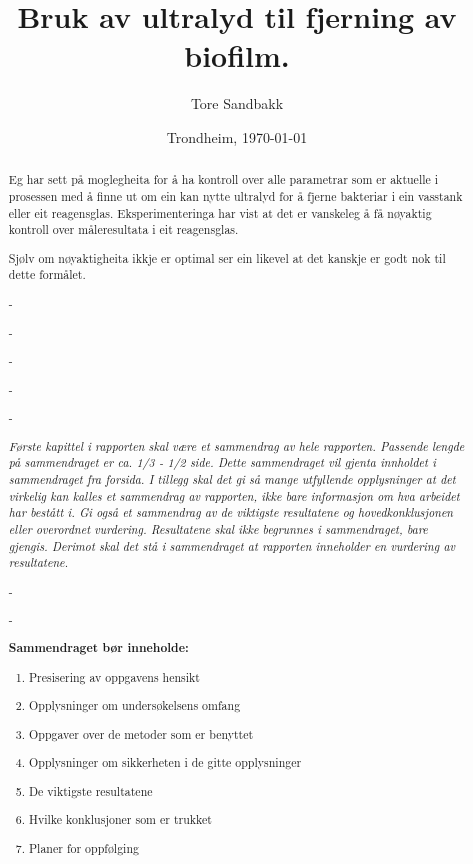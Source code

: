\documentclass[12pt,norsk]{article}
\title{Bruk av ultralyd til fjerning av biofilm.}
\author{Tore Sandbakk}
\date{Trondheim, \today}                                           %
\begin{document}
\maketitle
\thispagestyle{empty}

\newpage
\thispagestyle{empty}

\begin{abstract}
Eg har sett på moglegheita for å ha kontroll over alle parametrar som er aktuelle i prosessen med å finne ut om ein kan nytte ultralyd for å fjerne bakteriar i ein vasstank eller eit reagensglas. Eksperimenteringa har vist at det er vanskeleg å få nøyaktig kontroll over måleresultata i eit reagensglas.

Sjølv om nøyaktigheita ikkje er optimal ser ein likevel at det kanskje er godt nok til dette formålet. 

-

-

-

-

-

\emph{Første kapittel i rapporten skal være et sammendrag av hele rapporten. Passende lengde på sammendraget er ca. 1/3 - 1/2 side. Dette sammendraget vil gjenta innholdet i sammendraget fra forsida. I tillegg skal det gi så mange utfyllende opplysninger at det virkelig kan kalles et sammendrag av rapporten, ikke bare informasjon om hva arbeidet har bestått i. Gi også et sammendrag av de viktigste resultatene og hovedkonklusjonen eller overordnet vurdering. Resultatene skal ikke begrunnes i sammendraget, bare gjengis. Derimot skal det stå i sammendraget at rapporten inneholder en vurdering av resultatene.}

-

-

\textbf{Sammendraget bør inneholde:}
\begin{enumerate}
\item Presisering av oppgavens hensikt
\item Opplysninger om undersøkelsens omfang
\item Oppgaver over de metoder som er benyttet
\item Opplysninger om sikkerheten i de gitte opplysninger
\item De viktigste resultatene
\item Hvilke konklusjoner som er trukket
\item Planer for oppfølging
\end{enumerate}
\end{abstract}
\end{document}
